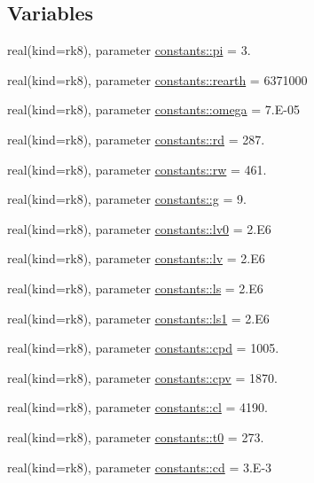 \subsection*{Variables}
\begin{DoxyCompactItemize}
\item 
real(kind=rk8), parameter \hyperlink{namespaceconstants_a064bd715409f723a4e6d45b6300c5ca0}{constants\+::pi} = 3.
\item 
real(kind=rk8), parameter \hyperlink{namespaceconstants_afaa5eaa2c9ee648a808fb8e1c94e76f8}{constants\+::rearth} = 6371000
\item 
real(kind=rk8), parameter \hyperlink{namespaceconstants_a67051296d7b4bcd0d4cee08bba6e46fa}{constants\+::omega} = 7.\+E-\/05
\item 
real(kind=rk8), parameter \hyperlink{namespaceconstants_ad91564da82b97ea0d29ce0565565db85}{constants\+::rd} = 287.
\item 
real(kind=rk8), parameter \hyperlink{namespaceconstants_a7ef8fc37397fbfbefd3c22883378dcc5}{constants\+::rw} = 461.
\item 
real(kind=rk8), parameter \hyperlink{namespaceconstants_a046aef138fbc8d05251d4fdc6eb3ee89}{constants\+::g} = 9.
\item 
real(kind=rk8), parameter \hyperlink{namespaceconstants_afb3befdfd57058ee9d073b832134a601}{constants\+::lv0} = 2.\+E6
\item 
real(kind=rk8), parameter \hyperlink{namespaceconstants_ab8db38b502faac0658c66b0d0b56c266}{constants\+::lv} = 2.\+E6
\item 
real(kind=rk8), parameter \hyperlink{namespaceconstants_a0fdb1c80757efccb4c694c79206a3d83}{constants\+::ls} = 2.\+E6
\item 
real(kind=rk8), parameter \hyperlink{namespaceconstants_abf3a57ecb3de0f79c3155c170db798f6}{constants\+::ls1} = 2.\+E6
\item 
real(kind=rk8), parameter \hyperlink{namespaceconstants_a32354adf3493f59d0fc17b0302b2c368}{constants\+::cpd} = 1005.
\item 
real(kind=rk8), parameter \hyperlink{namespaceconstants_afc5ea9cd5f9cf3a42e750ba5ab73c967}{constants\+::cpv} = 1870.
\item 
real(kind=rk8), parameter \hyperlink{namespaceconstants_a4f2911e99beba65b9371b9a80d7c08d0}{constants\+::cl} = 4190.
\item 
real(kind=rk8), parameter \hyperlink{namespaceconstants_a753fbbdd5d5b4af00d6819cb78ba99a1}{constants\+::t0} = 273.
\item 
real(kind=rk8), parameter \hyperlink{namespaceconstants_a84ecaaf3771cbbfe65f7b15ef26bee36}{constants\+::cd} = 3.\+E-\/3
\end{DoxyCompactItemize}
